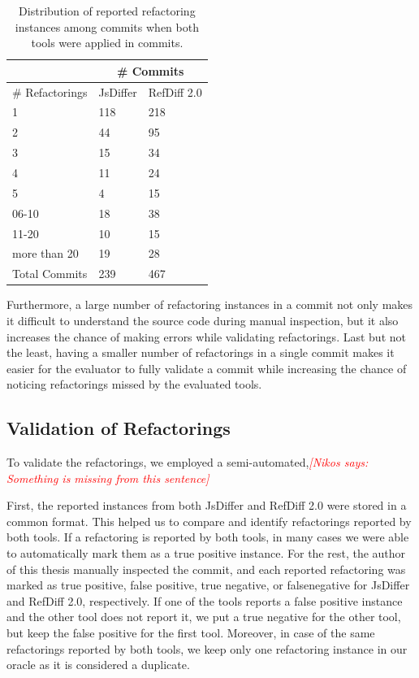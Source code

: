 \documentclass[letterpaper,12pt,onecolumn,final]{report}
\newcommand{\nikos}[1]{\textcolor{red}{{\it [Nikos says: #1]}}}
\begin{document}
\begin{table}[!ht]
    \centering
    \caption{Distribution of reported refactoring instances among commits when both tools were applied in \evTotalCommits{} commits.}
    \begin{tabular}{|l|l|l|}
    \hline
        & \multicolumn{2}{|c|}{\# Commits} \\ \hline
        \# Refactorings & JsDiffer & RefDiff 2.0 \\ \hline
        1 & 118 & 218 \\
        2 & 44 & 95 \\
        3 & 15 & 34 \\
        4 & 11 & 24 \\
        5 & 4 & 15 \\
        06-10 & 18 & 38 \\
        11-20 & 10 & 15 \\
        more than 20 & 19 & 28 \\ \hline
        Total Commits & 239 & 467 \\ \hline
    \end{tabular}
    \label{table:refcountrange}
\end{table}

Furthermore, a large number of refactoring instances in a commit not only makes it difficult to understand the source code during manual inspection, but it also increases the chance of making errors while validating refactorings. Last but not the least, having a smaller number of refactorings in a single commit makes it easier for the evaluator to fully validate a commit while increasing the chance of noticing refactorings missed by the evaluated tools. 

\subsection {Validation of Refactorings}
To validate the refactorings, we employed a semi-automated,\nikos{Something is missing from this sentence}

First, the reported instances from both JsDiffer and RefDiff 2.0 were stored in a common format. This helped us to compare and identify refactorings reported by both tools. If a refactoring is reported by both tools, in many cases we were able to automatically mark them as a true positive instance. For the rest, the author of this thesis manually inspected the commit, and each reported refactoring was marked as true positive, false positive, true negative, or falsenegative for JsDiffer and RefDiff 2.0, respectively. If one of the tools reports a false positive instance and the other tool does not report it, we put a true negative for the other tool, but keep the false positive for the first tool. Moreover, in case of the same refactorings reported by both tools, we keep only one refactoring instance in our oracle as it is considered a duplicate.
\end{document}
